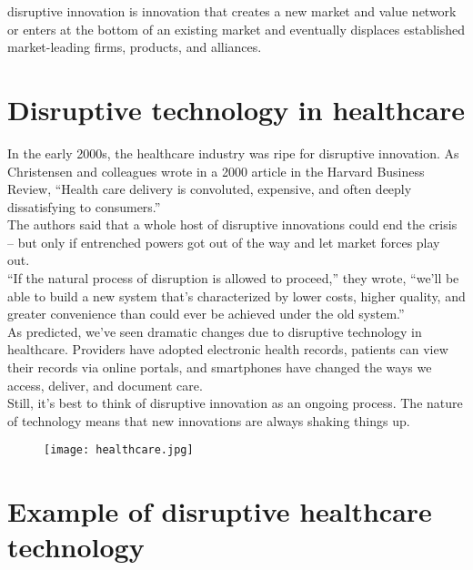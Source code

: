\documentclass[12pt]{article}
\begin{document}
\large\flushleft disruptive innovation is innovation that creates a new market and value network or enters at the bottom of an existing market and eventually displaces established market-leading firms, products, and alliances.

\section{\large\textbf{Disruptive technology in healthcare}}

\large In the early 2000s, the healthcare industry was ripe for disruptive innovation. As Christensen and colleagues wrote in a 2000 article in the Harvard Business Review, “Health care delivery is convoluted, expensive, and often deeply dissatisfying to consumers.”\\

The authors said that a whole host of disruptive innovations could end the crisis – but only if entrenched powers got out of the way and let market forces play out.\\

“If the natural process of disruption is allowed to proceed,” they wrote, “we’ll be able to build a new system that’s characterized by lower costs, higher quality, and greater convenience than could ever be achieved under the old system.”\\

As predicted, we’ve seen dramatic changes due to disruptive technology in healthcare. Providers have adopted electronic health records, patients can view their records via online portals, and smartphones have changed the ways we access, deliver, and document care.\\

Still, it’s best to think of disruptive innovation as an ongoing process. The nature of technology means that new innovations are always shaking things up.\\




\begin{figure}[h]
\centering
\texttt{[image: healthcare.jpg]}
\end{figure}





\flushleft\section{\centering\large\textbf{Example of disruptive healthcare technology}}
\end{document}
